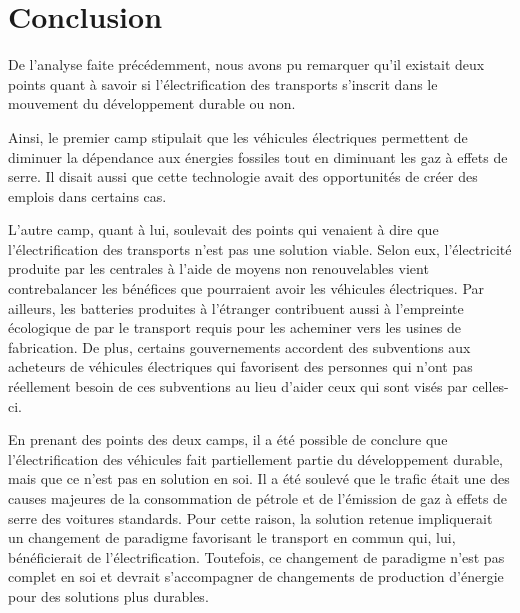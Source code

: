 
\chapter{Conclusion}

De l'analyse faite précédemment, nous avons pu remarquer qu'il existait deux points quant à savoir si l'électrification des transports s'inscrit dans le mouvement du développement durable ou non. 

Ainsi, le premier camp stipulait que les véhicules électriques permettent de diminuer la dépendance aux énergies fossiles tout en diminuant les gaz à effets de serre.
Il disait aussi que cette technologie avait des opportunités de créer des emplois dans certains cas.

L'autre camp, quant à lui, soulevait des points qui venaient à dire que l'électrification des transports n'est pas une solution viable. Selon eux, l'électricité produite par les centrales à l'aide de moyens non renouvelables vient contrebalancer les bénéfices que pourraient avoir les véhicules électriques. Par ailleurs, les batteries produites à l'étranger contribuent aussi à l'empreinte écologique de par le transport requis pour les acheminer vers les usines de fabrication. De plus, certains gouvernements accordent des subventions aux acheteurs de véhicules électriques qui favorisent des personnes qui n'ont pas réellement besoin de ces subventions au lieu d'aider ceux qui sont visés par celles-ci.

En prenant des points des deux camps, il a été possible de conclure que l'électrification des véhicules fait partiellement partie du développement durable, mais que ce n'est pas en solution en soi. Il a été soulevé que le trafic était une des causes majeures de la consommation de pétrole et de l'émission de gaz à effets de serre des voitures standards. Pour cette raison, la solution retenue impliquerait un changement de paradigme favorisant le transport en commun qui, lui, bénéficierait de l'électrification. Toutefois, ce changement de paradigme n'est pas complet en soi et devrait s'accompagner de changements de production d'énergie pour des solutions plus durables.
